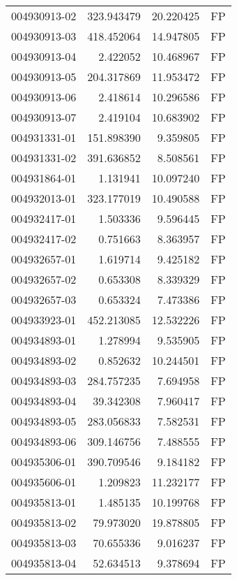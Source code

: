 \begin{tabular}{lrrl}
004930913-02 &  323.943479 &      20.220425 &   FP \\
004930913-03 &  418.452064 &      14.947805 &   FP \\
004930913-04 &    2.422052 &      10.468967 &   FP \\
004930913-05 &  204.317869 &      11.953472 &   FP \\
004930913-06 &    2.418614 &      10.296586 &   FP \\
004930913-07 &    2.419104 &      10.683902 &   FP \\
004931331-01 &  151.898390 &       9.359805 &   FP \\
004931331-02 &  391.636852 &       8.508561 &   FP \\
004931864-01 &    1.131941 &      10.097240 &   FP \\
004932013-01 &  323.177019 &      10.490588 &   FP \\
004932417-01 &    1.503336 &       9.596445 &   FP \\
004932417-02 &    0.751663 &       8.363957 &   FP \\
004932657-01 &    1.619714 &       9.425182 &   FP \\
004932657-02 &    0.653308 &       8.339329 &   FP \\
004932657-03 &    0.653324 &       7.473386 &   FP \\
004933923-01 &  452.213085 &      12.532226 &   FP \\
004934893-01 &    1.278994 &       9.535905 &   FP \\
004934893-02 &    0.852632 &      10.244501 &   FP \\
004934893-03 &  284.757235 &       7.694958 &   FP \\
004934893-04 &   39.342308 &       7.960417 &   FP \\
004934893-05 &  283.056833 &       7.582531 &   FP \\
004934893-06 &  309.146756 &       7.488555 &   FP \\
004935306-01 &  390.709546 &       9.184182 &   FP \\
004935606-01 &    1.209823 &      11.232177 &   FP \\
004935813-01 &    1.485135 &      10.199768 &   FP \\
004935813-02 &   79.973020 &      19.878805 &   FP \\
004935813-03 &   70.655336 &       9.016237 &   FP \\
004935813-04 &   52.634513 &       9.378694 &   FP \\

\end{tabular}
